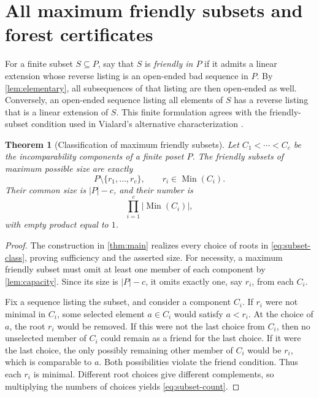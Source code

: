 \documentclass[11pt,letterpaper]{article}
\newtheorem{theorem}{Theorem}[section]
\theoremstyle{definition}
\theoremstyle{remark}
\newcommand{\Min}{\operatorname{Min}}
\begin{document}
\section{All maximum friendly subsets and forest certificates}
\label{sec:subsets}
For a finite subset $S\subseteq P$, say that $S$ is \emph{friendly in $P$}
if it admits a linear extension whose reverse listing is an open-ended bad
sequence in $P$. By \cref{lem:elementary}, all subsequences of that listing
are then open-ended as well. Conversely, an open-ended sequence listing
all elements of $S$ has a reverse listing that is a linear extension of $S$.
This finite formulation agrees with the friendly-subset condition used in
Vialard's alternative characterization \cite[Definition~4.4]{VialardMFCS}.

\begin{theorem}[Classification of maximum friendly subsets]\label{thm:subsets}
Let $C_1<\cdots<C_c$ be the incomparability components of a finite poset $P$.
The friendly subsets of maximum possible size are exactly
\begin{equation}\label{eq:subset-class}
 P\setminus\{r_1,\ldots,r_c\},\qquad r_i\in\Min(C_i).
\end{equation}
Their common size is $|P|-c$, and their number is
\begin{equation}\label{eq:subset-count}
 \prod_{i=1}^c |\Min(C_i)|,
\end{equation}
with empty product equal to $1$.
\end{theorem}
\begin{proof}
The construction in \cref{thm:main} realizes every choice of roots in
\eqref{eq:subset-class}, proving sufficiency and the asserted size.
For necessity, a maximum friendly subset must omit at least one member
of each component by \cref{lem:capacity}. Since its size is $|P|-c$, it
omits exactly one, say $r_i$, from each $C_i$.

Fix a sequence listing the subset, and consider a component $C_i$.
If $r_i$ were not minimal in $C_i$, some selected element $a\in C_i$
would satisfy $a<r_i$. At the choice of $a$, the root $r_i$ would be removed.
If this were not the last choice from $C_i$, then no unselected member of
$C_i$ could remain as a friend for the last choice. If it were the last
choice, the only possibly remaining other member of $C_i$ would be $r_i$,
which is comparable to $a$. Both possibilities violate the friend condition.
Thus each $r_i$ is minimal. Different root choices give different complements,
so multiplying the numbers of choices yields \eqref{eq:subset-count}.
\end{proof}
\end{document}
